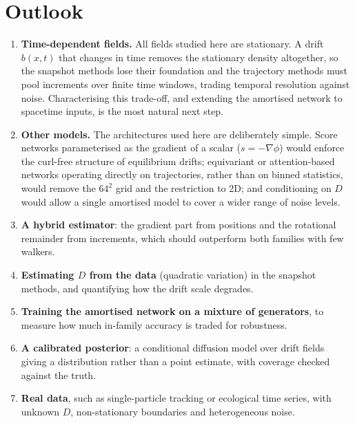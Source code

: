 \documentclass[11pt,a4paper]{article}
\begin{document}
\section{Outlook}

\begin{enumerate}[leftmargin=1.4em,itemsep=0.12em]
\item \textbf{Time-dependent fields.} All fields studied here are stationary. A drift
      $b(x,t)$ that changes in time removes the stationary density altogether, so the snapshot
      methods lose their foundation and the trajectory methods must pool increments over
      finite time windows, trading temporal resolution against noise. Characterising this
      trade-off, and extending the amortised network to space\textendash time inputs, is the
      most natural next step.
\item \textbf{Other models.} The architectures used here are deliberately simple. Score
      networks parameterised as the gradient of a scalar ($s=-\nabla\phi$) would enforce the
      curl-free structure of equilibrium drifts; equivariant or attention-based networks
      operating directly on trajectories, rather than on binned statistics, would remove the
      $64^2$ grid and the restriction to 2D; and conditioning on $D$ would allow a single
      amortised model to cover a wider range of noise levels.
\item \textbf{A hybrid estimator}: the gradient part from positions and the rotational
      remainder from increments, which should outperform both families with few walkers.
\item \textbf{Estimating $D$ from the data} (quadratic variation) in the snapshot methods,
      and quantifying how the drift scale degrades.
\item \textbf{Training the amortised network on a mixture of generators}, to measure how much
      in-family accuracy is traded for robustness.
\item \textbf{A calibrated posterior}: a conditional diffusion model over drift fields giving
      a distribution rather than a point estimate, with coverage checked against the truth.
\item \textbf{Real data}, such as single-particle tracking or ecological time series, with
      unknown $D$, non-stationary boundaries and heterogeneous noise.
\end{enumerate}

\end{document}
